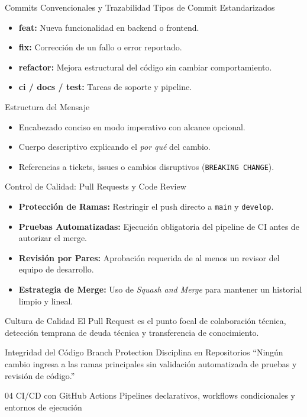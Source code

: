 \documentclass[aspectratio=169]{beamer}
\begin{document}
\contentSlideTwoCols
  {Commits Convencionales y Trazabilidad}
  {Tipos de Commit Estandarizados}
  {
    \begin{itemize}
      \item \textbf{feat:} Nueva funcionalidad en backend o frontend.
      \item \textbf{fix:} Corrección de un fallo o error reportado.
      \item \textbf{refactor:} Mejora estructural del código sin cambiar comportamiento.
      \item \textbf{ci / docs / test:} Tareas de soporte y pipeline.
    \end{itemize}
  }
  {Estructura del Mensaje}
  {
    \begin{itemize}
      \item Encabezado conciso en modo imperativo con alcance opcional.
      \item Cuerpo descriptivo explicando el \textit{por qué} del cambio.
      \item Referencias a tickets, issues o cambios disruptivos (\texttt{BREAKING CHANGE}).
    \end{itemize}
  }

\contentSlideBulletCard
  {Control de Calidad: Pull Requests y Code Review}
  {
    \begin{itemize}
      \item \textbf{Protección de Ramas:} Restringir el push directo a \texttt{main} y \texttt{develop}.
      \item \textbf{Pruebas Automatizadas:} Ejecución obligatoria del pipeline de CI antes de autorizar el merge.
      \item \textbf{Revisión por Pares:} Aprobación requerida de al menos un revisor del equipo de desarrollo.
      \item \textbf{Estrategia de Merge:} Uso de \textit{Squash and Merge} para mantener un historial limpio y lineal.
    \end{itemize}
  }
  {Cultura de Calidad}
  {El Pull Request es el punto focal de colaboración técnica, detección temprana de deuda técnica y transferencia de conocimiento.}

\contentSlideQuoteStat
  {Integridad del Código}
  {Branch Protection}
  {Disciplina en Repositorios}
  {“Ningún cambio ingresa a las ramas principales sin validación automatizada de pruebas y revisión de código.”}

\sectionSlideDark
  {04}
  {CI/CD con GitHub Actions}
  {Pipelines declarativos, workflows condicionales y entornos de ejecución}
\end{document}
